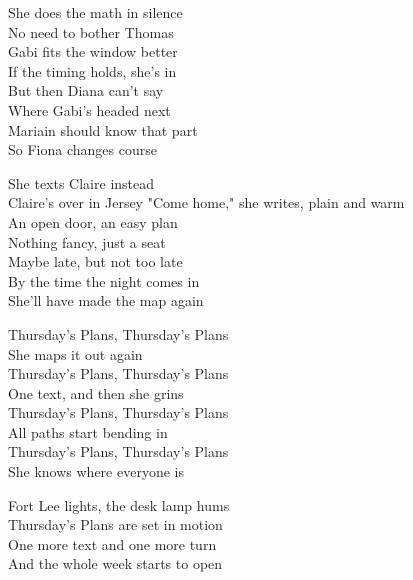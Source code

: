 \begin{lyrics}
She does the math in silence\\
No need to bother Thomas\\
Gabi fits the window better\\
If the timing holds, she's in\\
But then Diana can't say\\
Where Gabi's headed next\\
Mariain should know that part\\
So Fiona changes course

She texts Claire instead\\
Claire's over in Jersey
"Come home," she writes, plain and warm\\
An open door, an easy plan\\
Nothing fancy, just a seat\\
Maybe late, but not too late\\
By the time the night comes in\\
She'll have made the map again

Thursday's Plans, Thursday's Plans\\
She maps it out again\\
Thursday's Plans, Thursday's Plans\\
One text, and then she grins\\
Thursday's Plans, Thursday's Plans\\
All paths start bending in\\
Thursday's Plans, Thursday's Plans\\
She knows where everyone is

Fort Lee lights, the desk lamp hums\\
Thursday's Plans are set in motion\\
One more text and one more turn\\
And the whole week starts to open
\end{lyrics}


